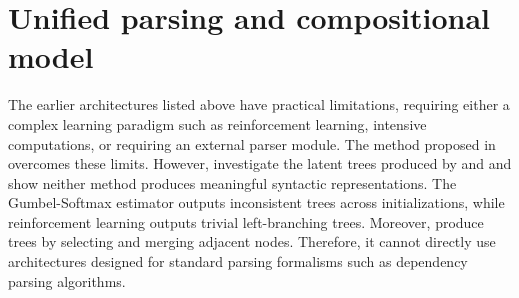 
\section{Unified parsing and compositional model}

The earlier architectures listed above have practical limitations, requiring either a complex learning paradigm such as reinforcement learning, intensive computations, or requiring an external parser module. The method proposed in \textcite{choi_18} overcomes these limits. However, \textcite{williams_18} investigate the latent trees produced by \textcite{yogatama_17} and \textcite{choi_18} and show neither method produces meaningful syntactic representations. The Gumbel-Softmax estimator outputs inconsistent trees across initializations, while reinforcement learning outputs trivial left-branching trees. Moreover, \textcite{choi_18} produce trees by selecting and merging adjacent nodes. Therefore, it cannot directly use architectures designed for standard parsing formalisms such as dependency parsing algorithms.


